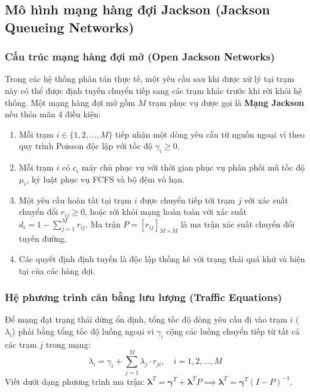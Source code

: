 \subsection{Mô hình mạng hàng đợi Jackson (Jackson Queueing Networks)}
\label{subsec:mang-hang-doi-jackson}

\subsubsection{Cấu trúc mạng hàng đợi mở (Open Jackson Networks)}

\hspace{0.5cm}Trong các hệ thống phân tán thực tế, một yêu cầu sau khi được xử lý tại trạm này có thể được định tuyến chuyển tiếp sang các trạm khác trước khi rời khỏi hệ thống. Một mạng hàng đợi mở gồm $M$ trạm phục vụ được gọi là \textbf{Mạng Jackson} nếu thỏa mãn 4 điều kiện:
\begin{enumerate}[leftmargin=1.5em]
    \item Mỗi trạm $i \in \{1, 2, \dots, M\}$ tiếp nhận một dòng yêu cầu từ nguồn ngoại vi theo quy trình Poisson độc lập với tốc độ $\gamma_i \ge 0$.
    \item Mỗi trạm $i$ có $c_i$ máy chủ phục vụ với thời gian phục vụ phân phối mũ tốc độ $\mu_i$, kỷ luật phục vụ FCFS và bộ đệm vô hạn.
    \item Một yêu cầu hoàn tất tại trạm $i$ được chuyển tiếp tới trạm $j$ với xác suất chuyển đổi $r_{ij} \ge 0$, hoặc rời khỏi mạng hoàn toàn với xác suất $d_i = 1 - \sum_{j=1}^M r_{ij}$. Ma trận $P = [r_{ij}]_{M \times M}$ là ma trận xác suất chuyển đổi tuyến đường.
    \item Các quyết định định tuyến là độc lập thống kê với trạng thái quá khứ và hiện tại của các hàng đợi.
\end{enumerate}

\subsubsection{Hệ phương trình cân bằng lưu lượng (Traffic Equations)}

\hspace{0.5cm}Để mạng đạt trạng thái dừng ổn định, tổng tốc độ dòng yêu cầu đi vào trạm $i$ ($\lambda_i$) phải bằng tổng tốc độ luồng ngoại vi $\gamma_i$ cộng các luồng chuyển tiếp từ tất cả các trạm $j$ trong mạng:
\begin{equation}
    \lambda_i = \gamma_i + \sum_{j=1}^M \lambda_j \cdot r_{ji}, \quad i = 1, 2, \dots, M
    \label{eq:traffic-equations}
\end{equation}
Viết dưới dạng phương trình ma trận: $\bm{\lambda}^T = \bm{\gamma}^T + \bm{\lambda}^T P \implies \bm{\lambda}^T = \bm{\gamma}^T (I - P)^{-1}$.

